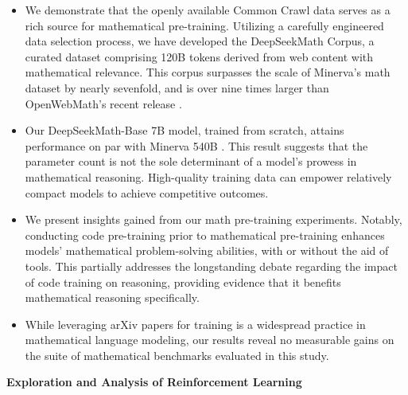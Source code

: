 \begin{itemize}[topsep=0pt]
    \item We demonstrate that the openly available Common Crawl data serves as a rich source for mathematical pre-training. Utilizing a carefully engineered data selection process, we have developed the DeepSeekMath Corpus, a curated dataset comprising 120B tokens derived from web content with mathematical relevance. This corpus surpasses the scale of Minerva’s math dataset \citep{minerva} by nearly sevenfold, and is over nine times larger than OpenWebMath’s recent release \citep{openwebmath}.

    \item Our DeepSeekMath-Base 7B model, trained from scratch, attains performance on par with Minerva 540B \citep{minerva}. This result suggests that the parameter count is not the sole determinant of a model’s prowess in mathematical reasoning. High-quality training data can empower relatively compact models to achieve competitive outcomes.

    \item We present insights gained from our math pre-training experiments. Notably, conducting code pre-training prior to mathematical pre-training enhances models' mathematical problem-solving abilities, with or without the aid of tools. This partially addresses the longstanding debate regarding the impact of code training on reasoning, providing evidence that it benefits mathematical reasoning specifically.

    \item While leveraging arXiv papers for training is a widespread practice in mathematical language modeling, our results reveal no measurable gains on the suite of mathematical benchmarks evaluated in this study.
\end{itemize}

\textbf{Exploration and Analysis of Reinforcement Learning}

